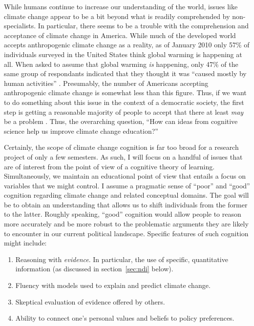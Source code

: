 While humans continue to increase our understanding of the world, issues like
climate change appear to be a bit beyond what is readily comprehended by
non-specialists. In particular, there seems to be a trouble with the
comprehension and acceptance of climate change in America. While much of the
developed world accepts anthropogenic climate change as a reality, as of January
2010 only 57\% of individuals surveyed in the United States think global warming
is happening at all. When asked to assume that global warming \emph{is}
happening, only 47\% of the same group of respondants indicated that they
thought it was ``caused mostly by human activities'' \cite[Q47 and Q50
in][]{leiserowitz_climate_2010}.  Presumably, the number of Americans accepting
anthropogenic climate change is somewhat less than this figure. Thus, if we want
to do something about this issue in the context of a democratic society, the
first step is getting a reasonable majority of people to accept that there at
least \emph{may} be a problem \cite{prochaska_toward_1986}.
Thus, the overarching question, ``How can ideas from cognitive science help us
improve climate change education?''

Certainly, the scope of climate change cognition is far too broad for a research
project of only a few semesters. As such, I will focus on a handful of issues
that are of interest from the point of view of a cognitive theory of learning.
Simultaneously, we maintain an educational point of view that entails a focus on
variables that we might control. I assume a pragmatic sense of ``poor'' and
``good'' cognition regarding climate change and related conceptual domains. The
goal will be to obtain an understanding that allows us to shift individuals from
the former to the latter. Roughly speaking, ``good'' cognition would allow
people to reason more accurately and be more robust to the problematic
arguments they are likely to encounter in our current political landscape.
Specific features of such cognition might include:

\begin{enumerate}
\item Reasoning with \emph{evidence}. In particular, the use of specific,
quantitative information (as discussed in section~\ref{sec:ndi} below).
\item Fluency with models used to explain and predict climate change.
\item Skeptical evaluation of evidence offered by others.
\item Ability to connect one's personal values and beliefs to policy
preferences.
\end{enumerate}

